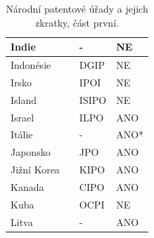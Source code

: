 \begin{table}[H]
\begin{tabular}{|>{\centering\arraybackslash}p{2.2cm}|>{\centering\arraybackslash}p{7.5cm}|>{\centering\arraybackslash}p{2cm}|>{\centering\arraybackslash}p{1cm}|}
	\hline
	Indie & \MYhref{http://www.ipindia.nic.in/}{Office of the Controller General of Patents, Designs and Trade Marks}  & -    & NE    \\ 
	\hline
	Indonésie & \MYhref{http://www.dgip.go.id/}{Directorate General of Intellectual Property}  & DGIP & NE        \\ 
	\hline
	Irsko & \MYhref{https://www.ipoi.gov.ie/en/}{Intellectual Property Office of Ireland}  & IPOI   & NE      \\ 
	\hline
	Island & \MYhref{https://www.isipo.is/}{Icelandic Intellectual Property Office}  & ISIPO    & NE     \\ 
	\hline
	Israel & \MYhref{https://www.gov.il/en/departments/ilpo}{The Israel Patent Office}  & ILPO    & ANO     \\ 
	\hline
	Itálie & \MYhref{https://uibm.mise.gov.it/index.php/it/}{Directorate General for the Protection of Industrial Property}  & -    & ANO*     \\ 
	\hline
	Japonsko & \MYhref{https://www.jpo.go.jp/e/index.html}{Japan Patent Office}  & JPO  & ANO       \\ 
	\hline
	Jižní Korea & \MYhref{http://www.kipo.go.kr/}{Korean Intellectual Property Office}  & KIPO   & ANO      \\ 
	\hline	
	Kanada & \MYhref{https://www.ic.gc.ca/}{Canadian Intellectual Property Office}  & CIPO  & ANO      \\ 
	\hline
	Kuba & \MYhref{http://www.ocpi.cu}{Cuban Industrial Property Office}  & OCPI   & NE      \\ 
	\hline
	Litva & \MYhref{http://vpb.lrv.lt/en/}{State Patent Bureau of the Republic of Lithuania}  & -    & ANO     \\
	\hline
	\end{tabular}
	\caption{Národní patentové úřady a jejich zkratky, část první.}
	\label{tab:table_offices1}
	\end{table}
\newpage

